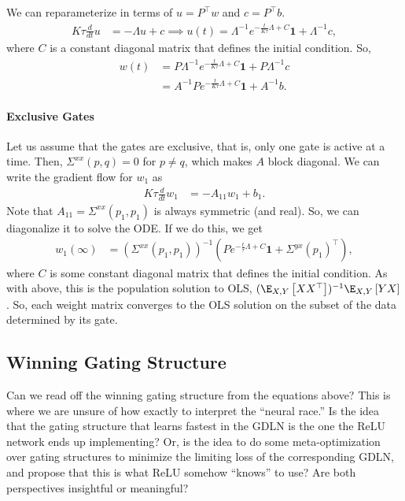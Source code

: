 \documentclass{article}
\begin{document}
We can reparameterize in terms of $u = P^\top w$ and $c = P^\top b$.
\begin{align}
  K \tau \frac{d}{dt} u &= - \Lambda u + c
  \implies
  u(t) = \Lambda^{-1} e^{ -\frac{t}{K \tau} \Lambda + C } \mathbf{1} + \Lambda^{-1} c,
\end{align}
where $C$ is a constant diagonal matrix that defines the initial condition.
So,
\begin{align}
  w(t) 
  &= P \Lambda^{-1} e^{ -\frac{t}{K \tau} \Lambda + C } \mathbf{1} + P \Lambda^{-1} c \\
  &= A^{-1} P e^{ -\frac{t}{K \tau} \Lambda + C } \mathbf{1} + A^{-1} b. \label{eq:grad_flow_solution}
\end{align}


\paragraph*{Exclusive Gates}
Let us assume that the gates are exclusive, that is, only one gate is active at a time.
Then, $\Sigma^{xx}(p,q) = 0$ for $p \neq q$, which makes $A$ block diagonal.
We can write the gradient flow for $w_1$ as
\begin{align}
  K \tau \frac{d}{dt} w_1 &= - A_{11} w_1 + b_1.
\end{align}
Note that $A_{11} = \Sigma^{xx}(p_1, p_1)$ is always symmetric (and real).
So, we can diagonalize it to solve the ODE.
If we do this, we get
\begin{align} \label{eq:exclusive_gates_limiting_solution}
  w_1(\infty) &= ( \Sigma^{xx}(p_1,p_1) )^{-1} \left( P e^{ -\frac{t}{\tau} \Lambda + C } \mathbf{1} + \Sigma^{yx}(p_1)^\top \right),
\end{align}
where $C$ is some constant diagonal matrix that defines the initial condition.
As with above, this is the population solution to OLS, $( \E_{X,Y} \left[ X X^\top \right] )^{-1} \E_{X,Y} \left[ Y X \right]$.
So, each weight matrix converges to the OLS solution on the subset of the data determined by its gate.


\subsection{Winning Gating Structure}

Can we read off the winning gating structure from the equations above?
This is where we are unsure of how exactly to interpret the ``neural race.''
Is the idea that the gating structure that learns fastest in the GDLN is the one the ReLU network ends up implementing?
Or, is the idea to do some meta-optimization over gating structures to minimize the limiting loss of the corresponding GDLN, and propose that this is what ReLU somehow ``knows'' to use?
Are both perspectives insightful or meaningful?
\end{document}
